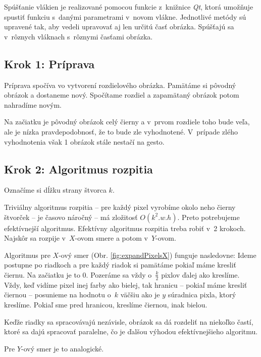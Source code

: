 Spúšťanie vlákien je realizované pomocou funkcie  z~knižnice \textit{Qt}, ktorá umožňuje spustiť funkciu s~danými parametrami v~novom vlákne. Jednotlivé metódy sú upravené tak, aby vedeli upravovať aj len určitú časť obrázka. Spúšťajú sa v~rôznych vláknach s~rôznymi časťami obrázka. %

\subsection{Krok 1: Príprava}
Príprava spočíva vo vytvorení rozdielového obrázka. Pamätáme si pôvodný obrázok a dostaneme nový. Spočítame rozdiel a zapamätaný obrázok potom nahradíme novým.

Na začiatku je pôvodný obrázok celý čierny a v~prvom rozdiele toho bude veľa, ale je nízka pravdepodobnosť, že to bude zle vyhodnotené. V~prípade zlého vyhodnotenia však 1 obrázok stále nestačí na gesto.

\subsection{Krok 2: Algoritmus rozpitia}
Označíme si dĺžku strany štvorca $k$.

Triviálny algoritmus rozpitia -- pre každý pixel vyrobíme okolo neho čierny štvorček -- je časovo náročný -- má zložitosť $O(k^2.w.h)$. Preto potrebujeme efektívnejší algoritmus. 
Efektívny algoritmus rozpitia treba robiť v~2 krokoch. Najskôr sa rozpije v~$X$-ovom smere a potom v~$Y$-ovom.

Algoritmus pre $X$-ový smer (Obr. \ref{fig:expandPixelsX}) funguje nasledovne: Ideme postupne po riadkoch a pre každý riadok si pamätáme pokiaľ máme kresliť čiernu.
Na začiatku je to 0. Pozeráme sa vždy o~$\frac{k}{2}$ pixlov ďalej ako kreslíme.
Vždy, keď vidíme pixel inej farby ako bielej, tak hranicu -- pokiaľ máme kresliť čiernou -- posunieme na hodnotu o~$k$ väčšiu ako je $y$ súradnica pixla, ktorý kreslíme. Pokiaľ sme pred hranicou, kreslíme čiernou, inak bielou. 

Keďže riadky sa spracovávajú nezávisle, obrázok sa dá rozdeliť na niekoľko častí, ktoré sa dajú spracovať paralelne, čo je ďalšou výhodou efektívnejšieho algoritmu.

Pre $Y$-ový smer je to analogické. 

